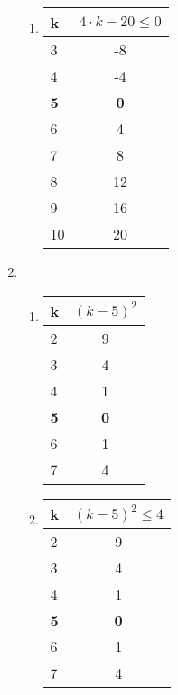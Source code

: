 \documentclass[a4paper]{article}
\begin{document}
\begin{enumerate}
\begin{enumerate}
			\item
			\begin{center}
				\begin{tabular}{|l|c|}
					\firsthline
						k & $4 \cdot k - 20 \leq 0$ \\
					\hline
						3 & -8 \\
					\hline
						4 & -4 \\
					\hline
						\textbf{5} & \textbf{0} \\
					\hline
						6 & 4 \\
					\hline
						7 & 8 \\
					\hline
						8 & 12 \\
					\hline
						9 & 16 \\
					\hline
						10 & 20 \\
					\hline
				\end{tabular}
			\end{center}
		\end{enumerate}
		
		\item
		\begin{enumerate}
			\item
			\begin{center}
				\begin{tabular}{|l|c|}
					\firsthline
						k & $(k - 5)^{2}$ \\
					\hline
						2 & 9 \\
					\hline
						3 & 4 \\
					\hline
						4 & 1 \\
					\hline
						\textbf{5} & \textbf{0} \\
					\hline
						6 & 1 \\
					\hline
						7 & 4 \\
					\hline
				\end{tabular}
			\end{center}
			
			\item
			\begin{center}
				\begin{tabular}{|l|c|}
					\firsthline
						k & $(k - 5)^{2} \leq 4$ \\
					\hline
						2 & 9 \\
					\hline
						3 & 4 \\
					\hline
						4 & 1 \\
					\hline
						\textbf{5} & \textbf{0} \\
					\hline
						6 & 1 \\
					\hline
						7 & 4 \\
					\hline
				\end{tabular}
			\end{center}
		\end{enumerate}
	\end{enumerate}
\end{document}
